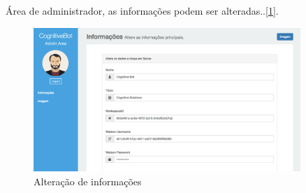 \newpage

\par Área de administrador, as informações podem ser alteradas..[\ref{fig:admin_info}].
\begin{figure}[!ht]
  \centering
      \includegraphics[width=0.9\textwidth]{admin_info}
  \caption{Alteração de informações}
  \label{fig:admin_info}
\end{figure}


